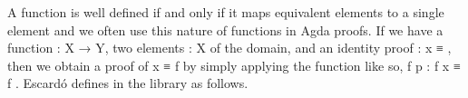 A function is well defined if and only if it maps equivalent elements to a single element and we often use this nature of functions in Agda proofs. If we have a function  \as : \ab X \as → \as Y, two elements   \as : \ab X of the domain, and an identity proof  \as : \ab x \ad ≡ , then we obtain a proof of  \ab x \ad ≡ \af f  by simply applying the  function like so,  \ab f \ab p \as : \ab f \ab x \ad ≡ \ab f . Escardó defines  in the \typetopology library as follows.
\ccpad
\begin{code}%
\>[1]\AgdaSpace{}%
\AgdaSymbol{:}\AgdaSpace{}%
\AgdaSymbol{\{}\AgdaSpace{}%
\AgdaSymbol{:}\AgdaSpace{}%
\AgdaSpace{}%
\AgdaSymbol{\}\{}\AgdaSpace{}%
\AgdaSymbol{:}\AgdaSpace{}%
\AgdaSpace{}%
\AgdaSymbol{\}(}\AgdaSpace{}%
\AgdaSymbol{:}\AgdaSpace{}%
\AgdaSpace{}%
\AgdaSpace{}%
\AgdaSymbol{)\{}\AgdaSpace{}%
\AgdaSpace{}%
\AgdaSymbol{:}\AgdaSpace{}%
\AgdaSymbol{\}}\AgdaSpace{}%
\AgdaSpace{}%
\AgdaSpace{}%
\AgdaSpace{}%
\AgdaSpace{}%
\AgdaSpace{}%
\AgdaSpace{}%
\AgdaSpace{}%
\AgdaSpace{}%
\AgdaSpace{}%
\<%
\\
%
\>[1]\AgdaSpace{}%
\AgdaSpace{}%
\AgdaSymbol{\{}\AgdaSymbol{\}}\AgdaSpace{}%
\AgdaSpace{}%
\AgdaSymbol{=}\AgdaSpace{}%
\AgdaSpace{}%
\AgdaSpace{}%
\AgdaBound{-}\AgdaSpace{}%
\AgdaSpace{}%
\AgdaSpace{}%
\AgdaSpace{}%
\AgdaSpace{}%
\AgdaSpace{}%
\AgdaBound{-}\AgdaSymbol{)}\AgdaSpace{}%
\AgdaSpace{}%
\AgdaSymbol{(}\AgdaSpace{}%
\AgdaSymbol{\{}\AgdaSpace{}%
\AgdaSymbol{=}\AgdaSpace{}%
\AgdaSpace{}%
\AgdaSymbol{\})}\<%
\end{code}
